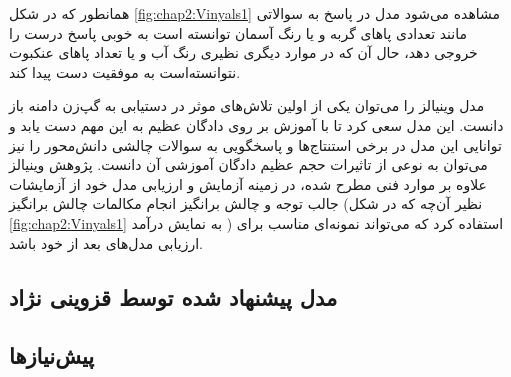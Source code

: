 همانطور که در شکل
\ref{fig:chap2:Vinyals1}
مشاهده‌ می‌شود مدل در پاسخ به سوالاتی مانند تعدادی پا‌های گربه و یا رنگ آسمان توانسته‌ است به خوبی پاسخ درست را خروجی دهد، حال آن که در موارد دیگری نظیری رنگ آب و یا تعداد پاهای عنکبوت نتوانسته‌است به موفقیت دست پیدا کند.

مدل وینیالز را می‌توان یکی از اولین تلاش‌های موثر در دستیابی به گپ‌زن دامنه باز دانست. این مدل سعی کرد تا با آموزش بر روی دادگان عظیم 
به این مهم دست یابد و توانایی این مدل در برخی استنتاج‌‌ها و پاسخگویی به سوالات چالشی دانش‌محور را نیز می‌توان به نوعی از تاثیرات حجم عظیم دادگان‌ آموزشی آن دانست. پژوهش وینیالز علاوه بر موارد فنی مطرح شده، در زمینه آزمایش و ارزیابی مدل خود از آزمایشات جالب توجه و چالش بر‌انگیز  انجام مکالمات چالش برانگیز 
(نظیر آن‌چه که در شکل 
\ref{fig:chap2:Vinyals1}
به نمایش درآمد
)
استفاده کرد که می‌تواند نمونه‌ای‌ مناسب برای ارزیابی مدل‌های بعد از خود باشد. 

\subsection{مدل پیشنهاد شده توسط قزوینی نژاد}


\subsection{پیش‌نیازها}

